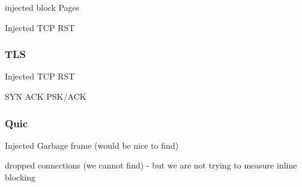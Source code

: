 injected block Pages

Injected TCP RST


\subsubsection{TLS}

Injected TCP RST

SYN ACK PSK/ACK

\subsubsection{Quic}

Injected Garbage frame (would be nice to find)

\medskip

dropped connections (we cannot find) - but we are not trying to measure inline blocking






